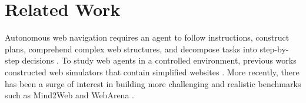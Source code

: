 \documentclass[11pt]{article}
\begin{document}

    
     





\section{Related Work}
Autonomous web navigation \citep{shi2017world, yang2023dawn} requires an agent to follow instructions, construct plans, comprehend complex web structures, and decompose tasks into step-by-step decisions \citep{weng2023prompt}. To study web agents in a controlled environment, previous works constructed web simulators that contain simplified websites \citep{shi2017world,yao2022webshop}. More recently, there has been a surge of interest in building more challenging and realistic benchmarks such as Mind2Web \cite{deng2023mind2web} and WebArena \cite{zhou2023webarena}. 
\end{document}
